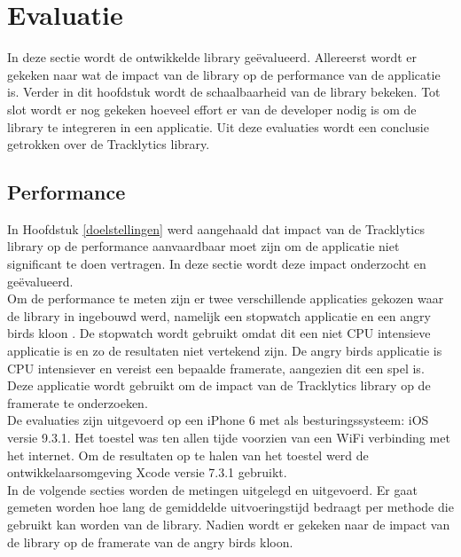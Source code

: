 \chapter{Evaluatie} \label{evaluatie}
In deze sectie wordt de ontwikkelde library ge\"evalueerd. Allereerst wordt er gekeken naar wat de impact van de library op de performance van de applicatie is. Verder in dit hoofdstuk wordt de schaalbaarheid van de library bekeken. Tot slot wordt er nog gekeken hoeveel effort er van de developer nodig is om de library te integreren in een applicatie. Uit deze evaluaties wordt een conclusie getrokken over de Tracklytics library.


\section{Performance}
In Hoofdstuk \ref{doelstellingen} werd aangehaald dat impact van de Tracklytics library op de performance aanvaardbaar moet zijn om de applicatie niet significant te doen vertragen. In deze sectie wordt deze impact onderzocht en ge\"evalueerd. \\

Om de performance te meten zijn er twee verschillende applicaties gekozen waar de library in ingebouwd werd, namelijk een stopwatch applicatie en een angry birds kloon \cite{AngryBirds}. De stopwatch wordt gebruikt omdat dit een niet CPU intensieve applicatie is en zo de resultaten niet vertekend zijn. De angry birds applicatie is CPU intensiever en vereist een bepaalde framerate, aangezien dit een spel is. Deze applicatie wordt gebruikt  om de impact van de Tracklytics library op de framerate te onderzoeken. \\

De evaluaties zijn uitgevoerd op een iPhone 6 \cite{iPhone} met als besturingssysteem: iOS versie 9.3.1. Het toestel was ten allen tijde voorzien van een WiFi verbinding met het internet. Om de resultaten op te halen van het toestel werd de ontwikkelaarsomgeving Xcode \cite{Xcode} versie 7.3.1 gebruikt.\\

In de volgende secties worden de metingen uitgelegd en uitgevoerd. Er gaat gemeten worden hoe lang de gemiddelde uitvoeringstijd bedraagt per methode die gebruikt kan worden van de library. Nadien wordt er gekeken naar de impact van de library op de framerate van de angry birds kloon.\\

